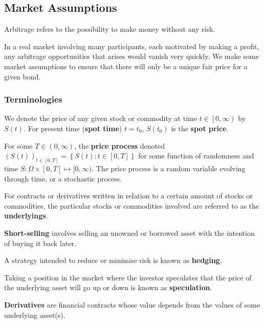 \subsection{Market Assumptions}
\begin{definition}[Arbitrage]
  Arbitrage refers to the possibility to make money without any risk.
\end{definition}
In a real market involving many participants, each motivated by making a
profit, any arbitrage opportunities that arises would vanish very quickly. We
make some market assumptions to ensure that there will only be a unique fair
price for a given bond.

\subsubsection{Terminologies}
\begin{definition}
  We denote the price of any given stock or commodity at time $t\in
  \left.\left[0,\infty\right. \right)$ by $S(t)$. For present time (\textbf{spot time})
  $t=t_0$, $S(t_0)$ is the \textbf{spot price}.
\end{definition}
\begin{definition}
  For some $T\in \left( 0,\infty \right) $, the \textbf{price process} denoted ${\left(
  S(t) \right)}_{t\in [0,T]}=\left\{ S(t):t\in \left[ 0,T \right] \right\}$ for
  some function of randomness and time $S:\Omega\times \left[ 0,T
  \right]\mapsto [0,\infty)$. The price process is a random variable evolving
  through time, or a stochastic process.
\end{definition}
\begin{definition}[Underlyings]
  For contracts or derivatives written in relation to a certain amount of
  stocks or commodities, the particular stocks or commodities involved are
  referred to as the \textbf{underlyings}.
\end{definition}
\begin{definition}
  \textbf{Short-selling} involves selling an unowned or borrowed asset
  with the intention of buying it back later.
\end{definition}
\begin{definition}[Hedging]
  A strategy intended to reduce or minimise risk is known as \textbf{hedging}.
\end{definition}
\begin{definition}[Speculation]
  Taking a position in the market where the investor speculates that the price
  of the underlying asset will go up or down is known as \textbf{speculation}.
\end{definition}
\begin{definition}[Derivatives]
  \textbf{Derivatives} are financial contracts whose value depends from the
  values of some underlying asset(s).
\end{definition}


